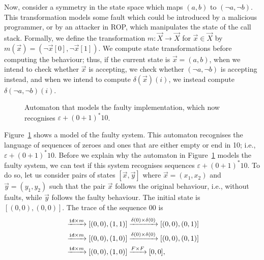 Now, %
consider a symmetry in the state space which maps $(a,b)$ to $(\lnot a, \lnot b)$. This transformation models some fault which could be introduced by a malicious programmer, or by an attacker in ROP, which manipulates the state of the call stack. Formally, %
we define the transformation $m\colon \vec{X}\rightarrow\vec{X}$ for $\vec{x}\in \vec{X}$ by $m(\vec{x})=(\lnot \vec{x}[0],\lnot \vec{x}[1])$. 
We compute state transformations before computing the behaviour; thus, if the current state is $\vec{x}=(a,b)$, when we intend to check whether $\vec{x}$ is accepting, we check whether $(\lnot a, \lnot b)$ is accepting instead, and when we intend to compute $\delta(\vec{x})(i)$, we instead compute $\delta(\lnot a, \lnot b)(i)$. 
\begin{figure}[t]
    \centering
{}
\caption{Automaton that models the faulty implementation, which now recognises $\varepsilon+(0+1)^*10$.}
\label{fig:Transformed}
\end{figure}
Figure~\ref{fig:Transformed} shows a model of the faulty system. This automaton recognises the language of sequences of zeroes and ones that are either empty or end in 10; i.e., $\varepsilon+(0+1)^*10$. 
Before we explain why the automaton in Figure~\ref{fig:Transformed} models the faulty system, we can test if this system recognises sequences $\varepsilon+(0+1)^*10$. %
To do so, let us consider pairs of states $[\vec{x},\vec{y}]$ where $\vec{x}=(x_1,x_2)$ and $\vec{y}=(y_1,y_2)$ such that the pair $\vec{x}$ follows the original behaviour, i.e., without faults, while $\vec{y}$ follows the faulty behaviour. 
The initial state is $[(0,0),(0,0)]$. %
The trace of the sequence $00$ is 
\begin{align*}
   [(0,0),(0,0)]&\xrightarrow{\id\times m}[(0,0),(1,1)]\xrightarrow{\delta(0)\times\delta(0)}[(0,0),(0,1)]\\
   &\xrightarrow{\id\times m}[(0,0),(1,0)]\xrightarrow{\delta(0)\times\delta(0)}[(0,0),(0,1)]\\
   &\xrightarrow{\id\times m}[(0,0),(1,0)]\xrightarrow{F\times F}[0,0],
\end{align*}
